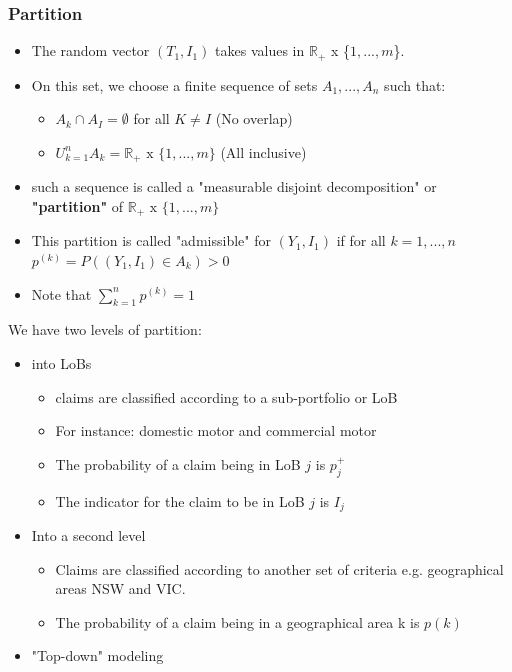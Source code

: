 \documentclass{article}
\begin{document}
\subsubsection{Partition}
\begin{itemize}
    \item The random vector $(T_1,I_1)$ takes values in $\mathbb{R}_+$ x \{$1,...,m$\}.
    \item On this set, we choose a finite sequence of sets $A_1,...,A_n$
    \subitem such that:
    \begin{itemize}
        \item $A_k \cap A_I = \emptyset $ for all $K \neq I$ (No overlap)
        \item $U_{k=1}^n A_k = \mathbb{R}_+ \text{ x } \{1,...,m\}$ (All inclusive)
    \end{itemize}
    \item such a sequence is called a "measurable disjoint decomposition" or \textbf{"partition"} of $\mathbb{R}_+ \text{ x } \{1,...,m\}$
    \item This partition is called "admissible" for $(Y_1,I_1)$ if for all $k = 1,...,n$
    \subitem $p^{(k)} = P((Y_1,I_1) \in A_k) > 0$
    \item Note that $\sum_{k=1}^n p^{(k)} = 1$
\end{itemize}

\noindent We have two levels of partition:
\begin{itemize}
    \item into LoBs
    \begin{itemize}
        \item claims are classified according to a sub-portfolio or LoB
        \item For instance: domestic motor and commercial motor
        \item The probability of a claim being in LoB $j$ is $p^+_j$
        \item The indicator for the claim to be in LoB $j$ is $I_j$
    \end{itemize}
    \item Into a second level
    \begin{itemize}
        \item Claims are classified according to another set of criteria 
        \subitem e.g. geographical areas NSW and VIC.
        \item The probability of a claim being in a geographical area k is $p(k)$
    \end{itemize}
    \item "Top-down" modeling
\end{itemize}
\end{document}
